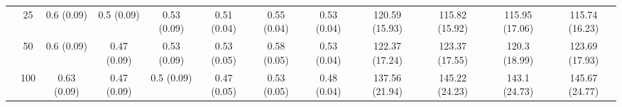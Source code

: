 \documentclass[10pt]{article}
\theoremstyle{definition}
\begin{document}
\begin{table}[H]
\begin{center}
{\begin{tabular}{cc|ccc|ccc|cccc|}
    & 25  & 0.6 (0.09) & 0.5 (0.09) & 0.53 (0.09) & 0.51 (0.04) & 0.55 (0.04) & 0.53 (0.04) & 120.59 (15.93) & 115.82 (15.92) & 115.95 (17.06) & 115.74 (16.23) \\ 
    & 50  & 0.6 (0.09) & 0.47 (0.09) & 0.53 (0.09) & 0.53 (0.05) & 0.58 (0.05) & 0.53 (0.04) & 122.37 (17.24) & 123.37 (17.55) & 120.3 (18.99) & 123.69 (17.93) \\ 
    & 100  & 0.63 (0.09) & 0.47 (0.09) & 0.5 (0.09) & 0.47 (0.05) & 0.53 (0.05) & 0.48 (0.04) & 137.56 (21.94) & 145.22 (24.23) & 143.1 (24.73) & 145.67 (24.77) \\
\end{tabular}}
   \end{center}
      \vspace{-.5cm}
\end{table}
\end{document}
